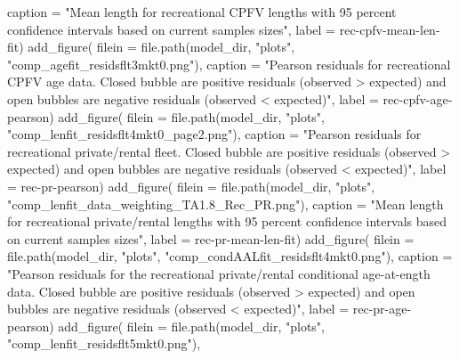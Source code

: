 \documentclass[
  letterpaper,
]{article}
\newenvironment{Shaded}{\begin{snugshade}}{\end{snugshade}}
\newcommand{\AttributeTok}[1]{\textcolor[rgb]{0.77,0.63,0.00}{#1}}
\newcommand{\FunctionTok}[1]{\textcolor[rgb]{0.00,0.00,0.00}{#1}}
\newcommand{\NormalTok}[1]{#1}
\newcommand{\StringTok}[1]{\textcolor[rgb]{0.31,0.60,0.02}{#1}}
\begin{document}
\begin{Shaded}
\begin{Highlighting}[]
\AttributeTok{caption =} \StringTok{"Mean length for recreational CPFV lengths with 95 percent confidence intervals based on current samples sizes"}\NormalTok{,}
\AttributeTok{label =} \StringTok{\textquotesingle{}rec{-}cpfv{-}mean{-}len{-}fit\textquotesingle{}}\NormalTok{)}
\FunctionTok{add\_figure}\NormalTok{(}
\AttributeTok{filein =} \FunctionTok{file.path}\NormalTok{(model\_dir, }\StringTok{"plots"}\NormalTok{, }\StringTok{"comp\_agefit\_residsflt3mkt0.png"}\NormalTok{), }
\AttributeTok{caption =} \StringTok{"Pearson residuals for recreational CPFV age data. Closed bubble are positive residuals (observed \textgreater{} expected) and open bubbles are negative residuals (observed \textless{} expected)"}\NormalTok{,}
\AttributeTok{label =} \StringTok{\textquotesingle{}rec{-}cpfv{-}age{-}pearson\textquotesingle{}}\NormalTok{)}
\FunctionTok{add\_figure}\NormalTok{(}
\AttributeTok{filein =} \FunctionTok{file.path}\NormalTok{(model\_dir, }\StringTok{"plots"}\NormalTok{, }\StringTok{"comp\_lenfit\_residsflt4mkt0\_page2.png"}\NormalTok{), }
\AttributeTok{caption =} \StringTok{"Pearson residuals for recreational private/rental fleet. Closed bubble are positive residuals (observed \textgreater{} expected) and open bubbles are negative residuals (observed \textless{} expected)"}\NormalTok{,}
\AttributeTok{label =} \StringTok{\textquotesingle{}rec{-}pr{-}pearson\textquotesingle{}}\NormalTok{)}
\FunctionTok{add\_figure}\NormalTok{(}
\AttributeTok{filein =} \FunctionTok{file.path}\NormalTok{(model\_dir, }\StringTok{"plots"}\NormalTok{, }\StringTok{"comp\_lenfit\_data\_weighting\_TA1.8\_Rec\_PR.png"}\NormalTok{), }
\AttributeTok{caption =} \StringTok{"Mean length for recreational private/rental lengths with 95 percent confidence intervals based on current samples sizes"}\NormalTok{,}
\AttributeTok{label =} \StringTok{\textquotesingle{}rec{-}pr{-}mean{-}len{-}fit\textquotesingle{}}\NormalTok{)}
\FunctionTok{add\_figure}\NormalTok{(}
\AttributeTok{filein =} \FunctionTok{file.path}\NormalTok{(model\_dir, }\StringTok{"plots"}\NormalTok{, }\StringTok{"comp\_condAALfit\_residsflt4mkt0.png"}\NormalTok{), }
\AttributeTok{caption =} \StringTok{"Pearson residuals for the recreational private/rental conditional age{-}at{-}ength data. Closed bubble are positive residuals (observed \textgreater{} expected) and open bubbles are negative residuals (observed \textless{} expected)"}\NormalTok{,}
\AttributeTok{label =} \StringTok{\textquotesingle{}rec{-}pr{-}age{-}pearson\textquotesingle{}}\NormalTok{)}
\FunctionTok{add\_figure}\NormalTok{(}
\AttributeTok{filein =} \FunctionTok{file.path}\NormalTok{(model\_dir, }\StringTok{"plots"}\NormalTok{, }\StringTok{"comp\_lenfit\_residsflt5mkt0.png"}\NormalTok{), }

\end{Highlighting}
\end{Shaded}
\end{document}
